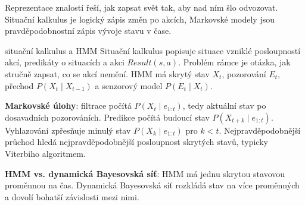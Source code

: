 \ucivo
\begin{intuice}
Reprezentace znalostí řeší, jak zapsat svět tak, aby nad ním šlo odvozovat. Situační kalkulus je logický zápis změn po akcích, Markovské modely jsou pravděpodobnostní zápis vývoje stavu v čase.
\end{intuice}

\begin{center}
\end{center}

\begin{defbox}{situační kalkulus a HMM}
Situační kalkulus popisuje situace vzniklé posloupností akcí, predikáty o situacích a akci $Result(s,a)$. Problém rámce je otázka, jak stručně zapsat, co se akcí nemění. HMM má skrytý stav $X_t$, pozorování $E_t$, přechod $P(X_t\mid X_{t-1})$ a senzorový model $P(E_t\mid X_t)$.
\end{defbox}

\textbf{Markovské úlohy}: filtrace počítá $P(X_t\mid e_{1:t})$, tedy aktuální stav po dosavadních pozorováních. Predikce počítá budoucí stav $P(X_{t+k}\mid e_{1:t})$. Vyhlazování zpřesňuje minulý stav $P(X_k\mid e_{1:t})$ pro $k<t$. Nejpravděpodobnější průchod hledá nejpravděpodobnější posloupnost skrytých stavů, typicky Viterbiho algoritmem.

\textbf{HMM vs. dynamická Bayesovská síť}: HMM má jednu skrytou stavovou proměnnou na čas. Dynamická Bayesovská síť rozkládá stav na více proměnných a dovolí bohatší závislosti mezi nimi.

